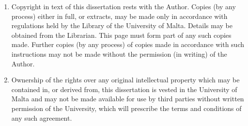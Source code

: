 \newpage
\begin{copyrightnotice}
\begin{enumerate}
    \item Copyright in text of this dissertation rests with the Author. Copies (by any process) either in full, or extracts, may be made only in accordance with regulations held by the Library of the University of Malta. Details may be obtained from the Librarian. This page must form part of any such copies made. Further copies (by any process) of copies made in accordance with such instructions may not be made without the permission (in writing) of the Author.
    \item Ownership of the rights over any original intellectual property which may be contained in, or derived from, this dissertation is vested in the University of Malta and may not be made available for use by third parties without written permission of the University, which will prescribe the terms and conditions of any such agreement.
\end{enumerate}

\end{copyrightnotice}